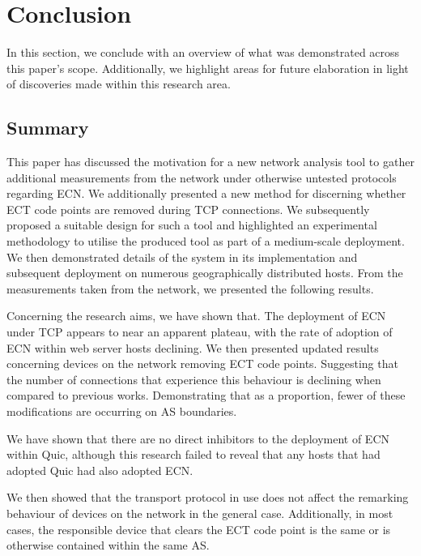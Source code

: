 \documentclass{l4proj}
\begin{document}
\chapter{Conclusion}

In this section, we conclude with an overview of what was demonstrated across this paper's scope. Additionally, we highlight areas for future elaboration in light of discoveries made within this research area.

\section{Summary}


This paper has discussed the motivation for a new network analysis tool to gather additional measurements from the network under otherwise untested protocols regarding ECN. We additionally presented a new method for discerning whether ECT code points are removed during TCP connections. We subsequently proposed a suitable design for such a tool and highlighted an experimental methodology to utilise the produced tool as part of a medium-scale deployment. We then demonstrated details of the system in its implementation and subsequent deployment on numerous geographically distributed hosts. From the measurements taken from the network, we presented the following results. 

Concerning the research aims, we have shown that. The deployment of ECN under TCP appears to near an apparent plateau, with the rate of adoption of ECN within web server hosts declining. We then presented updated results concerning devices on the network removing ECT code points. Suggesting that the number of connections that experience this behaviour is declining when compared to previous works. Demonstrating that as a proportion, fewer of these modifications are occurring on AS boundaries.

We have shown that there are no direct inhibitors to the deployment of ECN within Quic, although this research failed to reveal that any hosts that had adopted Quic had also adopted ECN.

We then showed that the transport protocol in use does not affect the remarking behaviour of devices on the network in the general case. Additionally, in most cases, the responsible device that clears the ECT code point is the same or is otherwise contained within the same AS.
\end{document}
